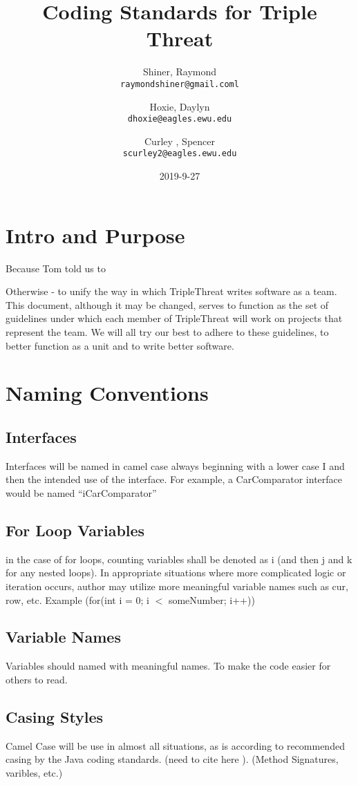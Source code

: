 \documentclass{article}
\title{\huge Coding Standards for Triple Threat}
\date{2019-9-27}
\author{
  Shiner, Raymond\\
  \texttt{raymondshiner@gmail.coml}
  \and
  Hoxie, Daylyn\\
  \texttt{dhoxie@eagles.ewu.edu}
  \and 
  Curley , Spencer\\
   \texttt{scurley2@eagles.ewu.edu}
}
\begin{document}
\maketitle

\newpage
\tableofcontents
\newpage
\section{Intro and Purpose} 
Because Tom told us to

\noindent Otherwise - to unify the way in which TripleThreat writes software as a team. This document, although it may be changed, serves to function as the set of guidelines under which each member of TripleThreat will work on projects that represent the team. We will all try our best to adhere to these guidelines, to better function as a unit and to write better software.

\section{Naming Conventions}
\subsection{Interfaces}
Interfaces will be named in camel case always beginning with a lower case I and then the intended use of the interface. For example, a CarComparator interface would be named “iCarComparator”
\subsection{For Loop Variables}
in the case of for loops, counting variables shall be denoted as i (and then j and k for any nested loops). In appropriate situations where more complicated logic or iteration occurs, author may utilize more meaningful variable names such as cur, row, etc.  \newline  Example \newline 
(for(int i = 0; i $<$ someNumber; i++))

\subsection{Variable Names} 
Variables should named with meaningful names. To make the code easier for others to read.
\subsection{Casing Styles}
Camel Case will be use in almost all situations, as is according to recommended casing by the Java coding standards. (need to cite here ). (Method Signatures, varibles, etc.) \newline 
\end{document}
